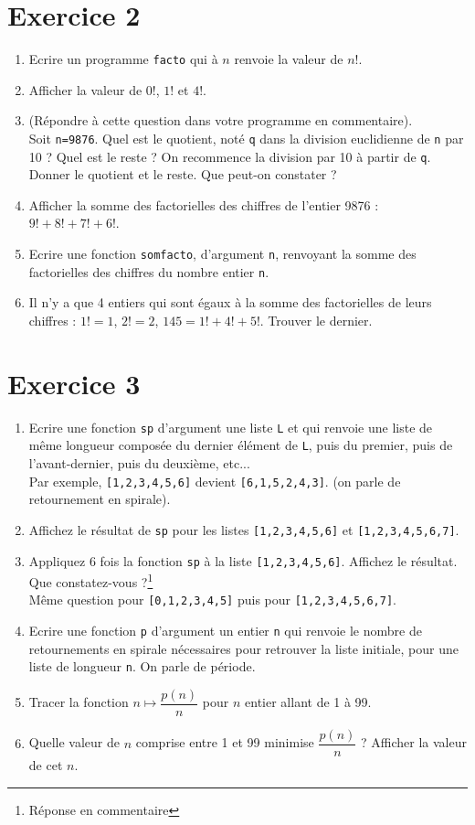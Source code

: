 \section*{Exercice 2}
\begin{enumerate}
\item Ecrire un programme \verb?facto? qui à $n$ renvoie la valeur de $n!$.
\item Afficher la valeur de $0!$, $1!$ et $4!$.
\item (Répondre à cette question dans votre programme en commentaire).\\ 
Soit \verb?n=9876?. Quel est le quotient, noté \verb?q? dans la division euclidienne de \verb?n? par 10 ? Quel est le reste ? On recommence la division par 10 à partir de \verb?q?. Donner le quotient et le reste. Que peut-on constater ?
\item Afficher la somme des factorielles des chiffres de l'entier 9876 : $9!+8!+7!+6!$.
\item Ecrire une fonction \verb?somfacto?, d'argument \verb?n?, renvoyant la somme des factorielles des chiffres du nombre entier \verb?n?.
\item Il n'y a que 4 entiers qui sont égaux à la somme des factorielles de leurs chiffres : $1!=1$, $2!=2$, $145=1!+4!+5!$. Trouver le dernier.
\end{enumerate}

\section*{Exercice 3}
\begin{enumerate}
\item Ecrire une fonction \verb?sp? d'argument une liste \verb?L? et qui renvoie une liste de même longueur composée du dernier élément de \verb?L?, puis du premier, puis de l'avant-dernier, puis du deuxième, etc...\\
Par exemple, \verb?[1,2,3,4,5,6]? devient \verb?[6,1,5,2,4,3]?. (on parle de retournement en spirale).
\item Affichez le résultat de \verb?sp? pour les listes \verb?[1,2,3,4,5,6]? et \verb?[1,2,3,4,5,6,7]?.
\item Appliquez 6 fois la fonction \verb?sp? à la liste \verb?[1,2,3,4,5,6]?. Affichez le résultat. Que constatez-vous ?\footnote{Réponse en commentaire}\\
Même question pour \verb?[0,1,2,3,4,5]? puis pour \verb?[1,2,3,4,5,6,7]?.
\item Ecrire une fonction \verb?p? d'argument un entier \verb?n? qui renvoie le nombre de retournements en spirale nécessaires pour retrouver la liste initiale, pour une liste de longueur \verb?n?. On parle de période.
\item Tracer la fonction $n\mapsto \dfrac{p(n)}{n}$ pour $n$ entier allant de 1 à 99.
\item Quelle valeur de $n$ comprise entre 1 et 99 minimise $\dfrac{p(n)}{n}$ ? Afficher la valeur de cet $n$.
\end{enumerate}




